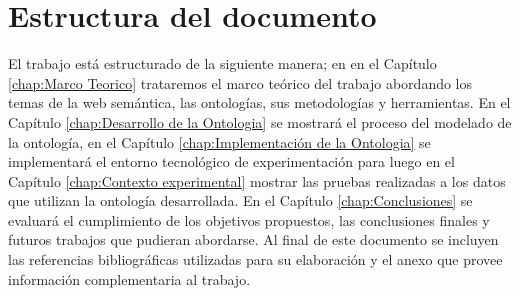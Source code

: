 \section{Estructura del documento}
El trabajo está estructurado de la siguiente manera; en  en el  Capítulo \ref{chap:Marco Teorico}  trataremos el marco teórico del trabajo abordando los temas de la web semántica, las ontologías, sus metodologías y herramientas. En el Capítulo \ref{chap:Desarrollo de la Ontologia} se mostrará el proceso del modelado de la ontología, en el Capítulo \ref{chap:Implementación de la Ontologia} se implementará el entorno tecnológico de experimentación para luego en el Capítulo  \ref{chap:Contexto experimental} mostrar las pruebas realizadas a los datos que utilizan la ontología desarrollada. En el Capítulo \ref{chap:Conclusiones} se evaluará el cumplimiento de los objetivos propuestos, las conclusiones finales y futuros trabajos que pudieran abordarse. Al final de este documento  se  incluyen las referencias bibliográficas utilizadas para su elaboración y el anexo que provee información complementaria al trabajo.


